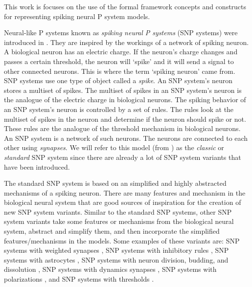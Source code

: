 \documentclass[a4paper]{article}
\theoremstyle{definition}
\begin{document}

This work is focuses on the use of the formal framework concepts and constructs for representing
spiking neural P system models. 

Neural-like P systems known as \textit{spiking neural P systems} (SNP systems) were introduced in    
\cite{ionescu-2006-snp}. They are inspired by the workings of a network of spiking neuron. A 
biological neuron has an electric charge. If the neuron's charge changes and passes a certain 
threshold, the neuron will `spike' and it will send a signal to other connected neurons. This is
where the term `spiking neuron' came from. SNP systems use one type of object called a \emph{spike}. 
An SNP system's neuron stores a multiset of spikes. The multiset of spikes in an SNP system's neuron 
is the analogue of the electric charge in biological neurons. The spiking behavior of an SNP
system's neuron is controlled by a set of rules. The rules look at the multiset of spikes in the
neuron and determine if the neuron should spike or not. These rules are the analogue of the
threshold mechanism in biological neurons. An SNP system is a network of such neurons. The neurons 
are connected to each other using \textit{synapses}. We  will refer to this model (from 
\cite{ionescu-2006-snp}) as the \textit{classic} or \textit{standard} SNP system since there are 
already a lot of SNP system variants that have been introduced.                                  
                                                                                                     
The standard SNP system is based on an simplified and highly abstracted mechanisms of a spiking      
neuron. There are many features and mechanism in the biological neural system that are good sources  
of inspiration for the creation of new SNP system variants. Similar to the standard SNP systems,     
other SNP system variants take some features or mechanisms from the biological neural system,        
abstract and simplify them, and then incorporate the simplified features/mechanisms in the models.   
Some examples of these variants are: SNP systems with weighted synapses
\cite{wang-2010-weights,pan-2012-weighted-synapses}, SNP systems with inhibitory rules 
\cite{peng-2019-inhibitory-rules}, SNP systems with astrocytes 
\cite{paun-2007-astrocyte-like,pan-2012-astrocytes}, SNP systems with 
neuron division, budding, and dissolution
\cite{wang-2011-neuron-division,pan-2011-division-budding,zhao-2016-division-dissolution}, 
SNP systems with dynamics synapses 
\cite{cabarle-2015-structural-plasticity,cabarle-2017-scheduled-synapses},
SNP systems with polarizations \cite{wu-2018-polarizations}, and SNP systems with thresholds         
\cite{zeng-2014-thresholds}.                                                                         
\end{document}
